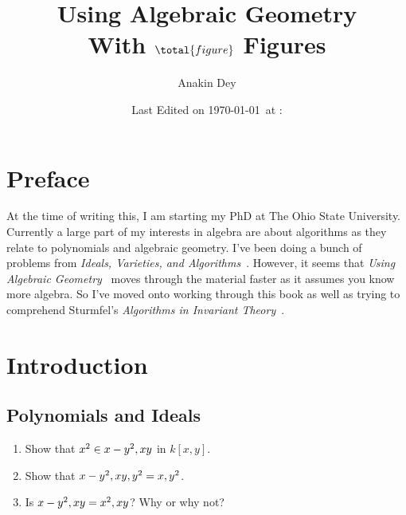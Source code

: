 \documentclass[letterpaper, 11pt, oneside]{book}
\title{\vspace{-100pt} {\Huge Using Algebraic Geometry} \\ {\small With $\total{figure}$ Figures}}
\author{\Large Anakin Dey}
\date{\small Last Edited on \today\ at \DTMfetchhour{now}:\DTMfetchminute{now}}
\newcommand{\CoverName}{Cover}
\begin{document}
\frontmatter
\renewcommand{\thepage}{\CoverName}
\maketitle


\tableofcontents
\clearpage


%

\chapter*{Preface}

At the time of writing this, I am starting my PhD at The Ohio State University.
Currently a large part of my interests in algebra are about algorithms as they relate to polynomials and algebraic geometry.
I've been doing a bunch of problems from \emph{Ideals, Varieties, and Algorithms}~\cite{book:IVA}.
However,  it seems that \emph{Using Algebraic Geometry}~\cite{book:UAG} moves through the material faster as it assumes you know more algebra.
So I've moved onto working through this book as well as trying to comprehend Sturmfel's \emph{Algorithms in Invariant Theory}~\cite{book:AlgosInInvTheory}.

\mainmatter

\chapter{Introduction}

\section{Polynomials and Ideals}

\begin{exercise}\label{ex:UAG_1.1.1}
  \begin{enumerate}[label= (\alph*)]
    \item Show that $x^{2} \in \ideal{x - y^{2}, xy}$ in $k[x, y]$.
    \item Show that $\ideal{x - y^{2}, xy, y^{2}} = \ideal{x, y^{2}}$.
    \item Is $\ideal{x - y^{2}, xy} = \ideal{x^{2}, xy}$? Why or why not?
  \end{enumerate}
\end{exercise}
\end{document}

